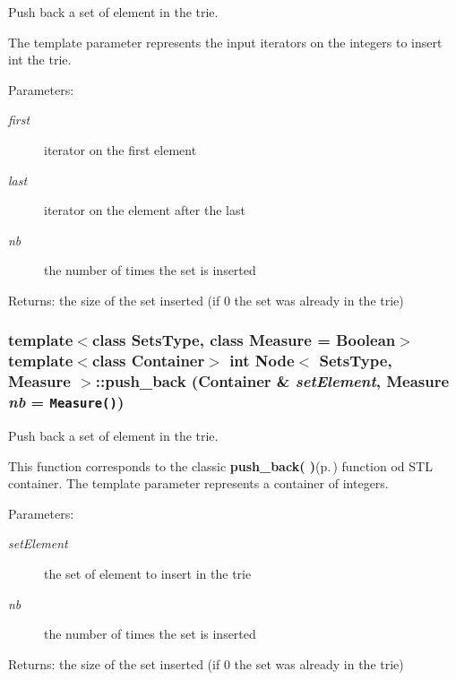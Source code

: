 Push back a set of element in the trie. 

The template parameter represents the input iterators on the integers to insert int the trie. \begin{Desc}
\item[Parameters:]
\begin{description}
\item[{\em first}]iterator on the first element \item[{\em last}]iterator on the element after the last \item[{\em nb}]the number of times the set is inserted \end{description}
\end{Desc}
\begin{Desc}
\item[Returns:]the size of the set inserted (if 0 the set was already in the trie) \end{Desc}
\subsubsection{\setlength{\rightskip}{0pt plus 5cm}template$<$class Sets\-Type, class Measure = Boolean$>$ template$<$class Container$>$ int {\bf Node}$<$ Sets\-Type, Measure $>$::push\_\-back (Container \& {\em set\-Element}, Measure {\em nb} = {\tt Measure()})\hspace{0.3cm}{\tt  [inline]}}\label{class_node_cca2b11c6bdb5944d3dbe558383113f5}


Push back a set of element in the trie. 

This function corresponds to the classic {\bf push\_\-back( )}{\rm (p.\,\pageref{class_node_cca2b11c6bdb5944d3dbe558383113f5})} function od STL container. The template parameter represents a container of integers. \begin{Desc}
\item[Parameters:]
\begin{description}
\item[{\em set\-Element}]the set of element to insert in the trie \item[{\em nb}]the number of times the set is inserted \end{description}
\end{Desc}
\begin{Desc}
\item[Returns:]the size of the set inserted (if 0 the set was already in the trie) \end{Desc}
